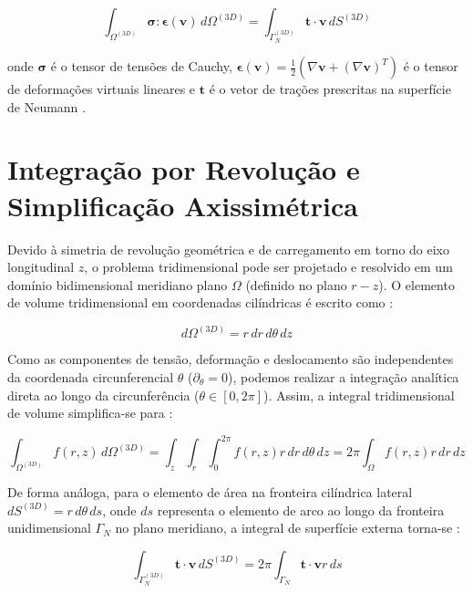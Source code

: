 \begin{equation}
  \int_{\Omega^{(3D)}} \mathbf{\sigma} : \mathbf{\epsilon}(\mathbf{v}) \, d \Omega^{(3D)} = \int_{\Gamma_N^{(3D)}} \mathbf{t} \cdot \mathbf{v} \, d S^{(3D)}
  \label{eq:ptv_3d}
\end{equation}

onde $\mathbf{\sigma}$ é o tensor de tensões de Cauchy, $\mathbf{\epsilon}(\mathbf{v}) = \frac{1}{2} (\nabla \mathbf{v} + (\nabla \mathbf{v})^T)$ é o tensor de deformações virtuais lineares e $\mathbf{t}$ é o vetor de trações prescritas na superfície de Neumann \cite{logg2012automated}.

\section{Integração por Revolução e Simplificação Axissimétrica}

Devido à simetria de revolução geométrica e de carregamento em torno do eixo longitudinal $z$, o problema tridimensional pode ser projetado e resolvido em um domínio bidimensional meridiano plano $\Omega$ (definido no plano $r-z$). O elemento de volume tridimensional em coordenadas cilíndricas é escrito como \cite{Sadd2009}:

\begin{equation}
  d \Omega^{(3D)} = r \, d r \, d \theta \, d z
  \label{eq:vol_element}
\end{equation}

Como as componentes de tensão, deformação e deslocamento são independentes da coordenada circunferencial $\theta$ ($\partial_{\theta} = 0$), podemos realizar a integração analítica direta ao longo da circunferência ($\theta \in [0, 2\pi]$). Assim, a integral tridimensional de volume simplifica-se para \cite{logg2012automated}:

\begin{equation}
  \int_{\Omega^{(3D)}} f(r, z) \, d \Omega^{(3D)} = \int_{z} \int_{r} \int_0^{2\pi} f(r, z) r \, d r \, d \theta \, d z = 2 \pi \int_{\Omega} f(r, z) r \, d r \, d z
  \label{eq:int_revol}
\end{equation}

De forma análoga, para o elemento de área na fronteira cilíndrica lateral $d S^{(3D)} = r \, d \theta \, d s$, onde $d s$ representa o elemento de arco ao longo da fronteira unidimensional $\Gamma_N$ no plano meridiano, a integral de superfície externa torna-se \cite{logg2012automated}:

\begin{equation}
  \int_{\Gamma_N^{(3D)}} \mathbf{t} \cdot \mathbf{v} \, d S^{(3D)} = 2 \pi \int_{\Gamma_N} \mathbf{t} \cdot \mathbf{v} r \, d s
  \label{eq:int_surf_revol}
\end{equation}

